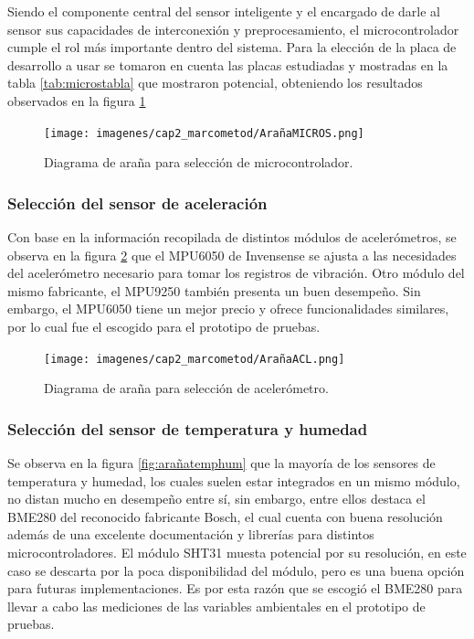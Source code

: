 Siendo el componente central del sensor inteligente y el encargado de darle al sensor sus capacidades de interconexión y preprocesamiento, el microcontrolador cumple el rol más importante dentro del sistema. Para la elección de la placa de desarrollo a usar se tomaron en cuenta las placas estudiadas y mostradas en la tabla \ref{tab:microstabla} que mostraron potencial, obteniendo los resultados observados en la figura \ref{fig:arañamcu}

\begin{figure}[H]
    \centering
    \texttt{[image: imagenes/cap2\_marcometod/ArañaMICROS.png]}
    \caption{Diagrama de araña para selección de microcontrolador.}
    \label{fig:arañamcu}
\end{figure}

\subsubsection{Selección del sensor de aceleración}

Con base en la información recopilada de distintos módulos de acelerómetros, se observa en la figura \ref{fig:arañaacl} que el MPU6050 de Invensense se ajusta a las necesidades del acelerómetro necesario para tomar los registros de vibración. Otro módulo del mismo fabricante, el MPU9250 también presenta un buen desempeño. Sin embargo, el MPU6050 tiene un mejor precio y ofrece funcionalidades similares, por lo cual fue el escogido para el prototipo de pruebas.


\begin{figure}[H]
    \centering
    \texttt{[image: imagenes/cap2\_marcometod/ArañaACL.png]}
    \caption{Diagrama de araña para selección de acelerómetro.}
    \label{fig:arañaacl}
\end{figure}

\subsubsection{Selección del sensor de temperatura y humedad}

Se observa en la figura \ref{fig:arañatemphum} que la mayoría de los sensores de temperatura y humedad, los cuales suelen estar integrados en un mismo módulo, no distan mucho en desempeño entre sí, sin embargo, entre ellos destaca el BME280 del reconocido fabricante Bosch, el cual cuenta con buena resolución además de una excelente documentación y librerías para distintos microcontroladores. El módulo SHT31 muesta potencial por su resolución, en este caso se descarta por la poca disponibilidad del módulo, pero es una buena opción para futuras implementaciones. Es por esta razón que se escogió el BME280 para llevar a cabo las mediciones de las variables ambientales en el prototipo de pruebas.

